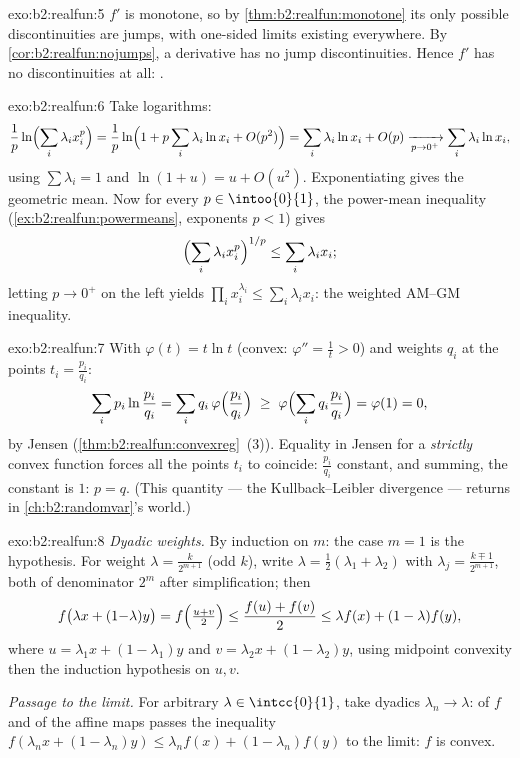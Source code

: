 \begin{solution}{exo:b2:realfun:5}
$f'$ is monotone, so by \cref{thm:b2:realfun:monotone} its only
possible discontinuities are jumps, with one-sided limits existing
everywhere. By \cref{cor:b2:realfun:nojumps}, a derivative has no
jump discontinuities. Hence $f'$ has no discontinuities at all:
.
\end{solution}

\begin{solution}{exo:b2:realfun:6}
Take logarithms:
\[
\frac1p \ln\Bigl(\sum_i \lambda_i x_i^p\Bigr)
= \frac1p \ln\Bigl(1 + p\sum_i \lambda_i \ln x_i +
O(p^2)\Bigr)
= \sum_i \lambda_i \ln x_i + O(p)
\xrightarrow[p \to 0^+]{} \sum_i \lambda_i \ln x_i ,
\]
using $\sum\lambda_i = 1$ and $\ln(1 + u) = u + O(u^2)$.
Exponentiating gives the geometric mean. Now for every $p \in
\intoo{0}{1}$, the power-mean inequality
(\cref{ex:b2:realfun:powermeans}, exponents $p < 1$) gives
\[
\Bigl(\sum_i \lambda_i x_i^p\Bigr)^{1/p} \leq \sum_i\lambda_i x_i ;
\]
letting $p \to 0^+$ on the left yields $\prod_i x_i^{\lambda_i}
\leq \sum_i \lambda_i x_i$: the weighted AM--GM inequality.
\end{solution}

\begin{solution}{exo:b2:realfun:7}
With $\varphi(t) = t\ln t$ (convex: $\varphi'' = \frac1t > 0$) and
weights $q_i$ at the points $t_i = \frac{p_i}{q_i}$:
\[
\sum_i p_i \ln\frac{p_i}{q_i}
= \sum_i q_i\, \varphi\Bigl(\frac{p_i}{q_i}\Bigr)
\;\geq\; \varphi\Bigl(\sum_i q_i \frac{p_i}{q_i}\Bigr)
= \varphi(1) = 0 ,
\]
by Jensen (\cref{thm:b2:realfun:convexreg}~(3)). Equality in
Jensen for a \emph{strictly} convex function forces all the points
$t_i$ to coincide: $\frac{p_i}{q_i}$ constant, and summing, the
constant is $1$: $p = q$. (This quantity --- the Kullback--Leibler
divergence --- returns in \cref{ch:b2:randomvar}'s world.)
\end{solution}

\begin{solution}{exo:b2:realfun:8}
\emph{Dyadic weights.} By induction on $m$: the case $m = 1$ is the
hypothesis. For weight $\lambda = \frac{k}{2^{m+1}}$ (odd $k$),
write $\lambda = \frac12(\lambda_1 + \lambda_2)$ with $\lambda_j =
\frac{k \mp 1}{2^{m+1}}$, both of denominator $2^m$ after
simplification; then
\[
f\bigl(\lambda x + (1{-}\lambda)y\bigr)
= f\Bigl(\tfrac{u + v}{2}\Bigr)
\leq \frac{f(u) + f(v)}{2}
\leq \lambda f(x) + (1 - \lambda) f(y),
\]
where $u = \lambda_1 x + (1 - \lambda_1)y$ and $v = \lambda_2 x +
(1-\lambda_2)y$, using midpoint convexity then the induction
hypothesis on $u, v$.

\emph{Passage to the limit.} For arbitrary $\lambda \in
\intcc{0}{1}$, take dyadics $\lambda_n \to \lambda$:  of
$f$ and of the affine maps passes the inequality
$f(\lambda_n x + (1-\lambda_n)y) \leq \lambda_n f(x) +
(1-\lambda_n)f(y)$ to the limit: $f$ is convex.
\end{solution}

